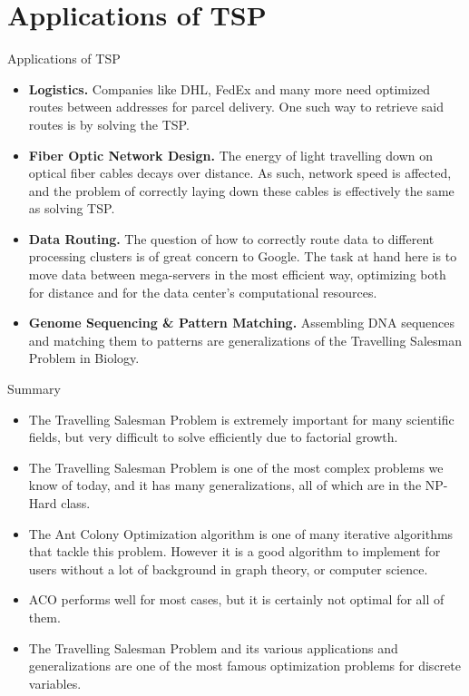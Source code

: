 \documentclass[aspectratio=169,xcolor=dvipsnames, t]{beamer}
\begin{document}
\section{Applications of TSP}
\begin{frame}{Applications of TSP}
	\vspace{-5mm}
	\begin{itemize}
		\item<2-> \textbf{Logistics.} Companies like DHL, FedEx and many more need optimized routes between addresses for parcel delivery. One such way to retrieve said routes is by solving the TSP.
		\item<3-> \textbf{Fiber Optic Network Design.} The energy of light travelling down on optical fiber cables decays over distance. As such, network speed is affected, and the problem of correctly laying down these cables is effectively the same as solving TSP.
		\item<4-> \textbf{Data Routing.} The question of how to correctly route data to different processing clusters is of great concern to Google. The task at hand here is to move data between mega-servers in the most efficient way, optimizing both for distance and for the data center's computational resources.
		\item<5-> \textbf{Genome Sequencing \& Pattern Matching.} Assembling DNA sequences and matching them to patterns are generalizations of the Travelling Salesman Problem in Biology.
	\end{itemize}
\end{frame}

\begin{frame}{Summary}
	\vspace{-5mm}
	\begin{itemize}
		\item<2-> The Travelling Salesman Problem is extremely important for many scientific fields, but very difficult to solve efficiently due to factorial growth.
		\item<3-> The Travelling Salesman Problem is one of the most complex problems we know of today, and it has many generalizations, all of which are in the NP-Hard class.
		\item<4-> The Ant Colony Optimization algorithm is one of many iterative algorithms that tackle this problem. However it is a good algorithm to implement for users without a lot of background in graph theory, or computer science.
		\item<5-> ACO performs well for most cases, but it is certainly not optimal for all of them.
		\item<6-> The Travelling Salesman Problem and its various applications and generalizations are one of the most famous optimization problems for discrete variables.
	\end{itemize}
\end{frame}
\end{document}
